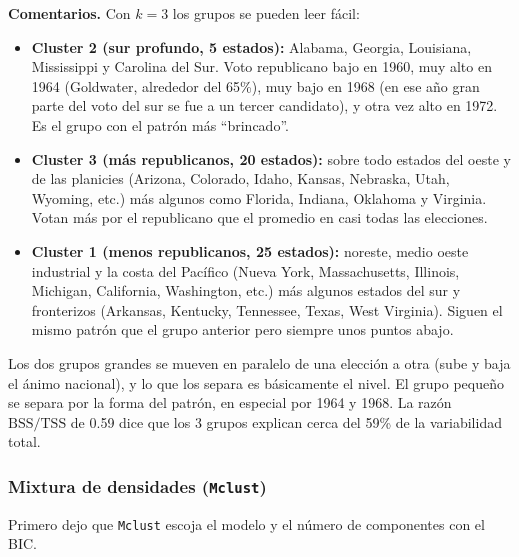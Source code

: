 \documentclass[11pt]{article}\usepackage[]{graphicx}\usepackage[]{xcolor}
\begin{document}
\textbf{Comentarios.} Con $k=3$ los grupos se pueden leer fácil:
\begin{itemize}[leftmargin=*]
\item \textbf{Cluster 2 (sur profundo, 5 estados):} Alabama, Georgia, Louisiana, Mississippi y Carolina del Sur. Voto republicano bajo en 1960, muy alto en 1964 (Goldwater, alrededor del 65\%), muy bajo en 1968 (en ese año gran parte del voto del sur se fue a un tercer candidato), y otra vez alto en 1972. Es el grupo con el patrón más ``brincado''.
\item \textbf{Cluster 3 (más republicanos, 20 estados):} sobre todo estados del oeste y de las planicies (Arizona, Colorado, Idaho, Kansas, Nebraska, Utah, Wyoming, etc.) más algunos como Florida, Indiana, Oklahoma y Virginia. Votan más por el republicano que el promedio en casi todas las elecciones.
\item \textbf{Cluster 1 (menos republicanos, 25 estados):} noreste, medio oeste industrial y la costa del Pacífico (Nueva York, Massachusetts, Illinois, Michigan, California, Washington, etc.) más algunos estados del sur y fronterizos (Arkansas, Kentucky, Tennessee, Texas, West Virginia). Siguen el mismo patrón que el grupo anterior pero siempre unos puntos abajo.
\end{itemize}
Los dos grupos grandes se mueven en paralelo de una elección a otra (sube y baja el ánimo nacional), y lo que los separa es básicamente el nivel. El grupo pequeño se separa por la forma del patrón, en especial por 1964 y 1968. La razón $\text{BSS}/\text{TSS}$ de 0.59 dice que los 3 grupos explican cerca del 59\% de la variabilidad total.

\subsubsection*{Mixtura de densidades (\texttt{Mclust})}

Primero dejo que \texttt{Mclust} escoja el modelo y el número de componentes con el BIC.
\end{document}
